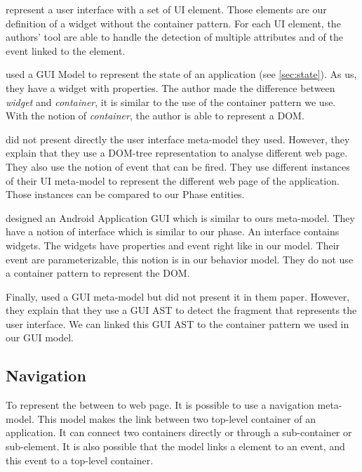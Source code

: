 \documentclass[conference]{IEEEtran}
\begin{document}
\citet{joorabchi2012reverse} represent a user interface with a set of UI element.
Those elements are our definition of a widget without the container pattern.
For each UI element, the authors' tool are able to handle the detection
    of multiple attributes and of the event linked to the element.

\citet{memon2007eventflow} used a GUI Model to represent the state of an application (see \ref{sec:state}).
As us, they have a widget with properties.
The author made the difference between \textit{widget} and \textit{container},
    it is similar to the use of the container pattern we use.
With the notion of \textit{container}, the author is able to represent a DOM.

\citet{mesbah2012crawling} did not present directly the user interface meta-model they used.
However, they explain that they use a DOM-tree representation to
    analyse different web page.
They also use the notion of event that can be fired.
They use different instances of their UI meta-model to represent the different web page of the application.
Those instances can be compared to our Phase entities.

\citet{amalfitano2012using} designed an Android Application GUI which is similar to ours meta-model.
They have a notion of interface which is similar to our phase.
An interface contains widgets.
The widgets have properties and event right like in our model.
Their event are parameterizable, this notion is in our behavior model.
They do not use a container pattern to represent the DOM.

Finally, \citet{silva2010guisurfer} used a GUI meta-model but did not present it
    in them paper.
However, they explain that they use a GUI AST to detect the fragment that represents the user interface.
We can linked this GUI AST to the container pattern we used in our GUI model.

\subsection{Navigation}
\label{sec:navigation}

To represent the between to web page.
It is possible to use a navigation meta-model.
This model makes the link between two top-level container of
    an application.
It can connect two containers directly or through a sub-container or sub-element.
It is also possible that the model links a element to an event,
    and this event to a top-level container.
\end{document}
